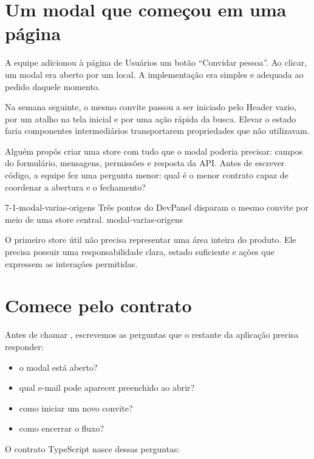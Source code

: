 \label{chap:primeiro-store}

\section{Um modal que começou em uma página}

\begin{historia}
A equipe adicionou à página de Usuários um botão ``Convidar pessoa''. Ao clicar,
um modal era aberto por um  local. A implementação era simples e
adequada ao pedido daquele momento.

Na semana seguinte, o mesmo convite passou a ser iniciado pelo Header vazio, por
um atalho na tela inicial e por uma ação rápida da busca. Elevar o estado faria
componentes intermediários transportarem propriedades que não utilizavam.

Alguém propôs criar uma store com tudo que o modal poderia precisar: campos do
formulário, mensagens, permissões e resposta da API. Antes de escrever código, a
equipe fez uma pergunta menor: qual é o menor contrato capaz de coordenar a
abertura e o fechamento?
\end{historia}

\imagemcapitulo
  {7-1-modal-varias-origens}
  {Três pontos do DevPanel disparam o mesmo convite por meio de uma store central.}
  {modal-varias-origens}

O primeiro store útil não precisa representar uma área inteira do produto. Ele
precisa possuir uma responsabilidade clara, estado suficiente e ações que
expressem as interações permitidas.

\section{Comece pelo contrato}

Antes de chamar , escrevemos as perguntas que o restante da
aplicação precisa responder:

\begin{itemize}
  \item o modal está aberto?
  \item qual e-mail pode aparecer preenchido ao abrir?
  \item como iniciar um novo convite?
  \item como encerrar o fluxo?
\end{itemize}

O contrato TypeScript nasce dessas perguntas:

